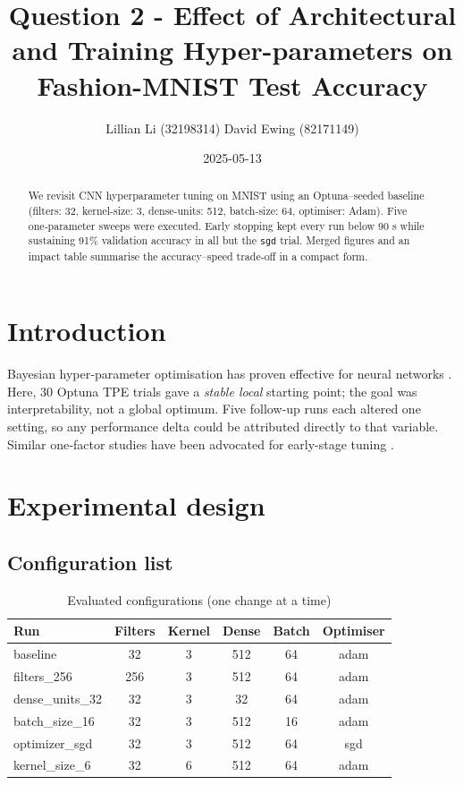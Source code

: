 \documentclass[12pt]{article}
\title{Question 2 - Effect of Architectural and Training Hyper-parameters on
       Fashion-MNIST Test Accuracy}
\author{Lillian Li (32198314) \qquad 
David Ewing (82171149)
}
\date{2025-05-13}
\begin{document}
\maketitle

\begin{abstract}
We revisit CNN hyperparameter tuning on MNIST using an Optuna–seeded baseline (filters: 32, kernel-size: 3, dense-units: 512, batch-size: 64, optimiser: Adam).  
Five one‑parameter sweeps were executed.  
Early stopping kept every run below 90 s while sustaining 91\% validation
accuracy in all but the \texttt{sgd} trial.  Merged figures and an impact table
summarise the accuracy--speed trade‑off in a compact form.
\end{abstract}

\section{Introduction}

Bayesian hyper‑parameter optimisation has proven effective for neural networks
\cite{akiba2019optuna}.  Here, 30 Optuna TPE trials gave a \emph{stable local}
starting point; the goal was interpretability, not a global optimum.  Five
follow‑up runs each altered one setting, so any performance delta could be
attributed directly to that variable.  Similar one‑factor studies have been
advocated for early-stage tuning \cite {kingma2015adam,lecun1998gradient}.

\section{Experimental design}
\subsection{Configuration list}

\begin{table}[h]
\centering
\caption{Evaluated configurations (one change at a time)}
\label{tab:config}
\begin{tabular}{@{}lccccc@{}}
\toprule
Run & Filters & Kernel & Dense & Batch & Optimiser \\
\midrule
baseline        & 32  & 3 & 512 & 64 & adam \\
filters\_256    & 256 & 3 & 512 & 64 & adam \\
dense\_units\_32& 32  & 3 & 32  & 64 & adam \\
batch\_size\_16 & 32  & 3 & 512 & 16 & adam \\
optimizer\_sgd  & 32  & 3 & 512 & 64 & sgd  \\
kernel\_size\_6 & 32  & 6 & 512 & 64 & adam \\
\bottomrule
\end{tabular}
\end{table}
\newpage
\end{document}
